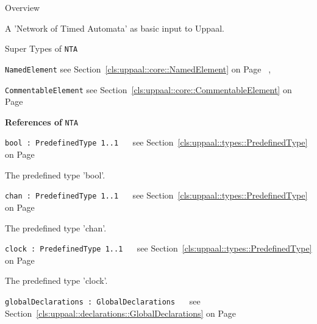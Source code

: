 	\begin{longdescription}
		\item[Overview] 		
				

	

		A 'Network of Timed Automata' as basic input to Uppaal.		
		\item[Super Types of \texttt{NTA}] ~
			\begin{longdescription}
				\item[\texttt{NamedElement}] see Section~\ref{cls:uppaal::core::NamedElement} on Page~\pageref{cls:uppaal::core::NamedElement}			, 				\item[\texttt{CommentableElement}] see Section~\ref{cls:uppaal::core::CommentableElement} on Page~\pageref{cls:uppaal::core::CommentableElement}						\end{longdescription}
		
	
			\item[\textbf{References of} \texttt{NTA}] ~
			\begin{longdescription}
	\item[\texttt{bool : PredefinedType 	\symbol{"5B}1..1\symbol{"5D}
}] ~
	see Section~\ref{cls:uppaal::types::PredefinedType} on Page~\pageref{cls:uppaal::types::PredefinedType}
	
	\nopagebreak
		
				

	

		The predefined type 'bool'.		
	\item[\texttt{chan : PredefinedType 	\symbol{"5B}1..1\symbol{"5D}
}] ~
	see Section~\ref{cls:uppaal::types::PredefinedType} on Page~\pageref{cls:uppaal::types::PredefinedType}
	
	\nopagebreak
		
				

	

		The predefined type 'chan'.		
	\item[\texttt{clock : PredefinedType 	\symbol{"5B}1..1\symbol{"5D}
}] ~
	see Section~\ref{cls:uppaal::types::PredefinedType} on Page~\pageref{cls:uppaal::types::PredefinedType}
	
	\nopagebreak
		
				

	

		The predefined type 'clock'.		
	\item[\texttt{globalDeclarations : GlobalDeclarations 	}] ~
	see Section~\ref{cls:uppaal::declarations::GlobalDeclarations} on Page~\pageref{cls:uppaal::declarations::GlobalDeclarations}
	

\end{longdescription}
\end{longdescription}
